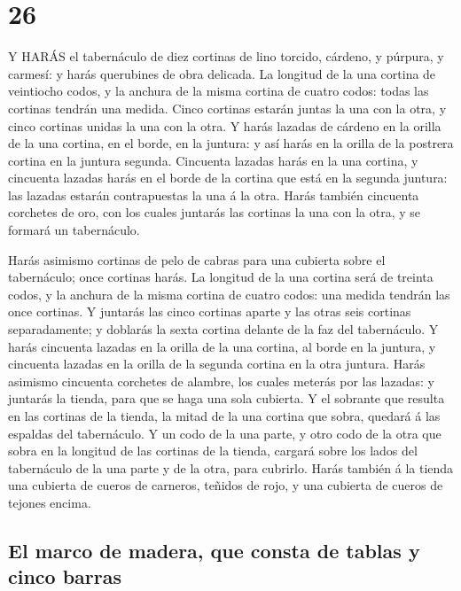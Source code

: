 \hypertarget{section-25}{%
\section{26}\label{section-25}}

 Y HARÁS el tabernáculo de diez cortinas de lino torcido,
cárdeno, y púrpura, y carmesí: y harás querubines de obra delicada.
 La longitud de la una cortina de veintiocho codos, y la
anchura de la misma cortina de cuatro codos: todas las cortinas tendrán
una medida.  Cinco cortinas estarán juntas la una con la
otra, y cinco cortinas unidas la una con la otra.  Y harás
lazadas de cárdeno en la orilla de la una cortina, en el borde, en la
juntura: y así harás en la orilla de la postrera cortina en la juntura
segunda.  Cincuenta lazadas harás en la una cortina, y
cincuenta lazadas harás en el borde de la cortina que está en la segunda
juntura: las lazadas estarán contrapuestas la una á la otra.
 Harás también cincuenta corchetes de oro, con los cuales
juntarás las cortinas la una con la otra, y se formará un tabernáculo.

 Harás asimismo cortinas de pelo de cabras para una cubierta
sobre el tabernáculo; once cortinas harás.  La longitud de
la una cortina será de treinta codos, y la anchura de la misma cortina
de cuatro codos: una medida tendrán las once cortinas.  Y
juntarás las cinco cortinas aparte y las otras seis cortinas
separadamente; y doblarás la sexta cortina delante de la faz del
tabernáculo.  Y harás cincuenta lazadas en la orilla de la
una cortina, al borde en la juntura, y cincuenta lazadas en la orilla de
la segunda cortina en la otra juntura.  Harás asimismo
cincuenta corchetes de alambre, los cuales meterás por las lazadas: y
juntarás la tienda, para que se haga una sola cubierta.  Y
el sobrante que resulta en las cortinas de la tienda, la mitad de la una
cortina que sobra, quedará á las espaldas del tabernáculo. 
Y un codo de la una parte, y otro codo de la otra que sobra en la
longitud de las cortinas de la tienda, cargará sobre los lados del
tabernáculo de la una parte y de la otra, para cubrirlo. 
Harás también á la tienda una cubierta de cueros de carneros, teñidos de
rojo, y una cubierta de cueros de tejones encima.

\hypertarget{el-marco-de-madera-que-consta-de-tablas-y-cinco-barras}{%
\subsection{El marco de madera, que consta de tablas y cinco
barras}\label{el-marco-de-madera-que-consta-de-tablas-y-cinco-barras}}

